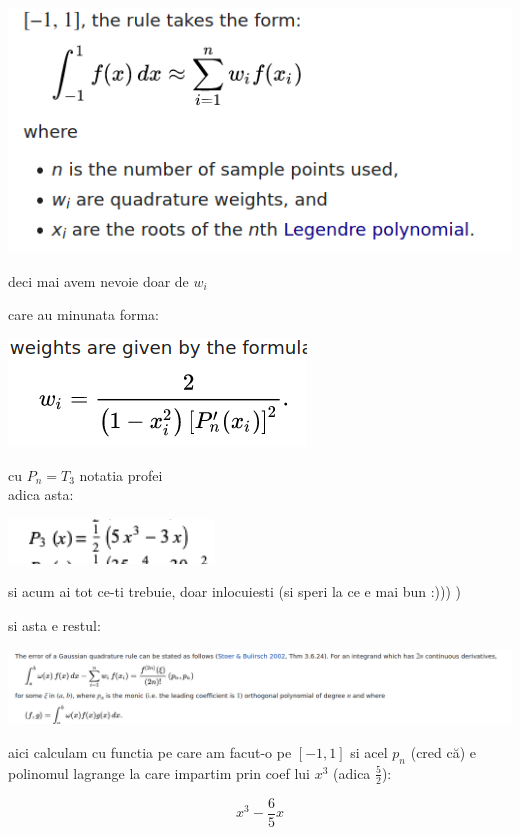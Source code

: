 \documentclass[11pt]{article}
\begin{document}
\begin{center}
\includegraphics[width=.6\linewidth]{./formula.png}
\end{center}

deci mai avem nevoie doar de \(w_i\)
\medskip

care au minunata forma:

\begin{center}
\includegraphics[width=.4\linewidth]{./w_i.png}
\end{center}

cu \(P_n = T_3\) notatia profei\\
adica asta:

\begin{center}
\includegraphics[width=.4\linewidth]{./lagrange3.png}
\end{center}

si acum ai tot ce-ti trebuie, doar inlocuiesti
(si speri la ce e mai bun :))) )
\medskip

si asta e restul:

\begin{center}
\includegraphics[width=\linewidth]{./rest.png}
\end{center}

aici calculam cu functia pe care am facut-o pe \([-1, 1]\)
si acel \(p_n\) (cred că) e polinomul lagrange la care impartim prin coef lui \(x^3\) (adica \(\frac{5}{2}\)):

\[x^3 - \frac{6}{5} x\]
\end{document}
